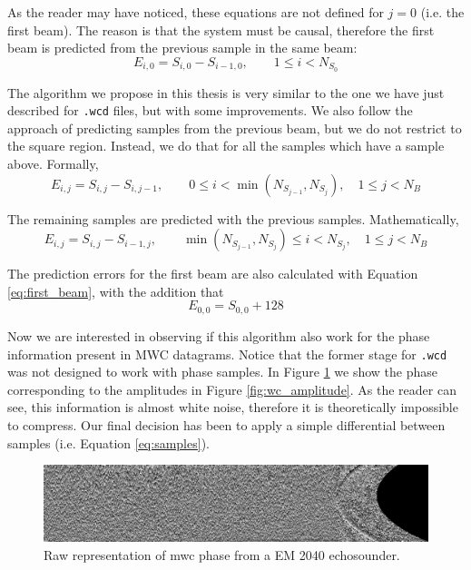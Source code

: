 As the reader may have noticed, these equations are not defined for $j=0$ (i.e. the first beam). The reason is that the system must be causal, therefore the first beam is predicted from the previous sample in the same beam:
\begin{equation} \label{eq:first_beam}
E_{i,0} = S_{i,0} - S_{i-1,0}, \qquad 1 \leq i < N_{S_0}
\end{equation}

The algorithm we propose in this thesis is very similar to the one we have just described for \texttt{.wcd} files, but with some improvements. We also follow the approach of predicting samples from the previous beam, but we do not restrict to the square region. Instead, we do that for all the samples which have a sample above. Formally,
\begin{equation}
E_{i,j} = S_{i,j} - S_{i,j-1}, \qquad 0 \leq i < \min(N_{S_{j-1}}, N_{S_j}), \quad 1 \leq j < N_B
\end{equation}

The remaining samples are predicted with the previous samples. Mathematically,
\begin{equation} \label{eq:samples}
E_{i,j} = S_{i,j} - S_{i-1,j}, \qquad \min(N_{S_{j-1}}, N_{S_j}) \leq i < N_{S_j}, \quad 1 \leq j < N_B
\end{equation}

The prediction errors for the first beam are also calculated with Equation \ref{eq:first_beam}, with the addition that
\begin{equation}
E_{0,0} = S_{0,0} + 128
\end{equation}

Now we are interested in observing if this algorithm also work for the phase information present in MWC datagrams. Notice that the former stage for \texttt{.wcd} was not designed to work with phase samples. In Figure \ref{fig:wc_phase} we show the phase corresponding to the amplitudes in Figure \ref{fig:wc_amplitude}. As the reader can see, this information is almost white noise, therefore it is theoretically impossible to compress. Our final decision has been to apply a simple differential between samples (i.e. Equation \ref{eq:samples}).
\begin{figure}[h!]
	\begin{center}
		\includegraphics[scale=0.334]{images/water_column_ph.png}
	\end{center}
	\caption{Raw representation of \acrshort{mwc} phase from a EM 2040 echosounder.}
	\label{fig:wc_phase}
\end{figure}

